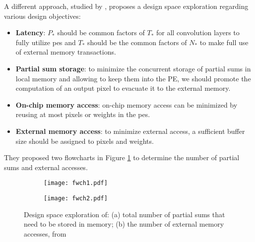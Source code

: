 A different approach, studied by \textcite{ma_optimizing_2018}, proposes a design space exploration regarding various design objectives:
\begin{itemize}
    \item \textbf{Latency}: $P_*$ should be common factors of  $T_*$ for all convolution layers to fully utilize \acrshort{pe}s and $T_*$ should be the common factors of  $N_*$ to make full use of external memory transactions.
    \item \textbf{Partial sum storage}: to minimize the concurrent storage of partial sums in local memory and allowing to keep them into the PE, we should promote the computation of an output pixel to evacuate it to the external memory.
    \item \textbf{On-chip memory access}: on-chip memory access can be minimized by reusing at most pixels or weights in the \acrshort{pe}s.
    \item \textbf{External memory access}: to minimize external access, a sufficient buffer size should be assigned to pixels and weights.
\end{itemize}

They proposed two flowcharts in Figure \ref{fig:flowchart} to determine the number of partial sums and external accesses. 
%
\begin{figure}[H]
\centering
    \begin{subfigure}{.45\textwidth}
    \centering
    \texttt{[image: fwch1.pdf]}
    \caption{ }
    \end{subfigure}
    \begin{subfigure}{.45\textwidth}
    \centering
    \texttt{[image: fwch2.pdf]}
    \caption{ }
    \end{subfigure}
    \caption{Design space exploration of: (a) total number of partial sums that need to be stored in memory; (b) the number of external memory accesses, from \cite{ma_optimizing_2018}}
    \label{fig:flowchart}
\end{figure}
